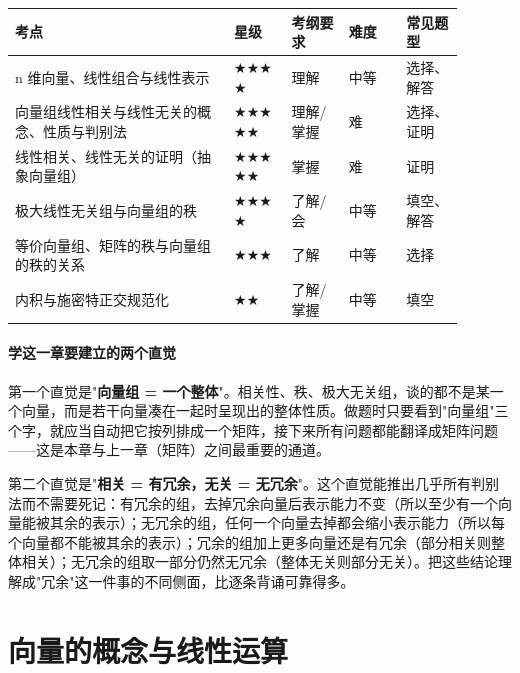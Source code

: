 \documentclass[11pt,openany,UTF8]{ctexbook}
\begin{document}
\begingroup\small\setlength{\tabcolsep}{4.0pt}
\begin{longtable}{@{}L{0.4240\linewidth}L{0.1175\linewidth}L{0.1175\linewidth}L{0.1175\linewidth}L{0.1175\linewidth}@{}}
\toprule
\textbf{考点} & \textbf{星级} & \textbf{考纲要求} & \textbf{难度} & \textbf{常见题型} \\
\midrule
\endhead
n 维向量、线性组合与线性表示 & $\bigstar$$\bigstar$$\bigstar$$\bigstar$ & 理解 & 中等 & 选择、解答 \\
向量组线性相关与线性无关的概念、性质与判别法 & $\bigstar$$\bigstar$$\bigstar$$\bigstar$$\bigstar$ & 理解/掌握 & 难 & 选择、证明 \\
线性相关、线性无关的证明（抽象向量组） & $\bigstar$$\bigstar$$\bigstar$$\bigstar$$\bigstar$ & 掌握 & 难 & 证明 \\
极大线性无关组与向量组的秩 & $\bigstar$$\bigstar$$\bigstar$$\bigstar$ & 了解/会 & 中等 & 填空、解答 \\
等价向量组、矩阵的秩与向量组的秩的关系 & $\bigstar$$\bigstar$$\bigstar$ & 了解 & 中等 & 选择 \\
内积与施密特正交规范化 & $\bigstar$$\bigstar$ & 了解/掌握 & 中等 & 填空 \\
\bottomrule
\end{longtable}
\endgroup

\paragraph{学这一章要建立的两个直觉}\mbox{}{\par}

第一个直觉是"\textbf{向量组 = 一个整体}"。相关性、秩、极大无关组，谈的都不是某一个向量，而是若干向量凑在一起时呈现出的整体性质。做题时只要看到"向量组"三个字，就应当自动把它按列排成一个矩阵，接下来所有问题都能翻译成矩阵问题——这是本章与上一章（矩阵）之间最重要的通道。

第二个直觉是"\textbf{相关 = 有冗余，无关 = 无冗余}"。这个直觉能推出几乎所有判别法而不需要死记：有冗余的组，去掉冗余向量后表示能力不变（所以至少有一个向量能被其余的表示）；无冗余的组，任何一个向量去掉都会缩小表示能力（所以每个向量都不能被其余的表示）；冗余的组加上更多向量还是有冗余（部分相关则整体相关）；无冗余的组取一部分仍然无冗余（整体无关则部分无关）。把这些结论理解成"冗余"这一件事的不同侧面，比逐条背诵可靠得多。

\section{向量的概念与线性运算}
\end{document}

